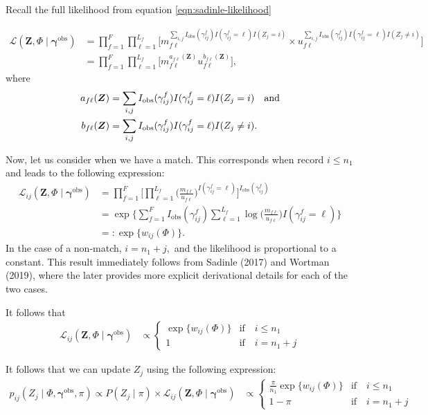\documentclass[ba]{imsart}
\newcommand{\bZ}{\boldsymbol{Z}}
\newcommand{\bgamma}{\boldsymbol{\gamma}}
\begin{document}
\newpage
Recall the full likelihood from equation \ref{eqn:sadinle-likelihood}

\begin{align}
\mathcal{L}(\bZ, \Phi \mid \bgamma^{\text{obs}}) 
&= 
\prod_{f=1}^{F}
\prod_{\ell=1}^{L_f}
\bigg[
m_{f\ell}^{
\sum_{i,j} I_{\text{obs}}(\gamma_{ij}^f)I(\gamma_{ij}^f = \ell)I(Z_j = i)
}
\times
u_{f\ell}^{
\sum_{i,j} I_{\text{obs}}(\gamma_{ij}^f)I(\gamma_{ij}^f = \ell)I(Z_j \neq i)
}
\bigg]\\
& = 
\prod_{f=1}^{F}
\prod_{\ell=1}^{L_f}
\bigg[
m_{f\ell}^{a_{f\ell}(\bZ)}
u_{f\ell}^{b_{f\ell}(\bZ)}
\bigg],
\end{align}
where 
\begin{align}
\label{eqn:ab}
a_{f\ell}(\bZ) &= \sum_{i,j} I_{\text{obs}}(\gamma_{ij}^f)I(\gamma_{ij}^f = \ell)I(Z_j = i) \quad \text{and} \\
b_{f\ell}(\bZ) &= \sum_{i,j} I_{\text{obs}}(\gamma_{ij}^f)I(\gamma_{ij}^f = \ell)I(Z_j \neq i). \notag
\end{align}


Now, let us consider when we have a match. This corresponds when record $i \leq n_1$ and leads to the following expression:
\begin{align}
\mathcal{L}_{ij}(\bZ, \Phi \mid \bgamma^{\text{obs}}) 
&= \prod_{f=1}^F 
\bigg[
\prod_{\ell=1}^{L_f} 
\bigg(
\frac{m_{f \ell}}
{u_{f \ell}
}
\bigg) ^{
I(\gamma_{ij}^f = \ell)
}
\bigg]^{I_{\text{obs}}(\gamma_{ij}^f)} \\
&= \exp  
\bigg \{
\sum_{f=1}^F
I_{\text{obs}}(\gamma_{ij}^f)
\sum_{\ell =1}^{L_f}
\log 
\bigg(
\frac{m_{f \ell}}
{u_{f \ell}
}
\bigg)
I(\gamma_{ij}^f = \ell)
\bigg\} \\
&=: \exp \{ w_{ij}(\Phi) \}.
\end{align}
In the case of a non-match, $i = n_1 + j,$ and the likelihood is proportional to a constant. This result immediately follows from Sadinle (2017) and Wortman (2019), where the later provides more explicit derivational details for each of the two cases. 

It follows that 
\begin{align}
\mathcal{L}_{ij}(\bZ, \Phi \mid \bgamma^{\text{obs}}) 
&\propto
\begin{cases}
  \exp \{ w_{ij}(\Phi) \}  & \text{if} \quad  i \leq n_1 \\
  1 & \text{if} \quad i = n_1 + j
\end{cases}
\end{align}


It follows that we can update $Z_j$ using the following expression:
\begin{align}
\label{eqn:partition}
p_{ij} (Z_{j} \mid \Phi, \bgamma^{\text{obs}}, \pi) 
\propto P(Z_j \mid \pi) \times \mathcal{L}_{ij}(\bZ, \Phi \mid \bgamma^{\text{obs}}) 
&\propto
\begin{cases}
 \frac{\pi}{n_1} \exp \{ w_{ij}(\Phi) \}  & \text{if} \quad  i \leq n_1 \\
  1 - \pi & \text{if} \quad i = n_1 + j
\end{cases}\\
\end{align}
\end{document}

